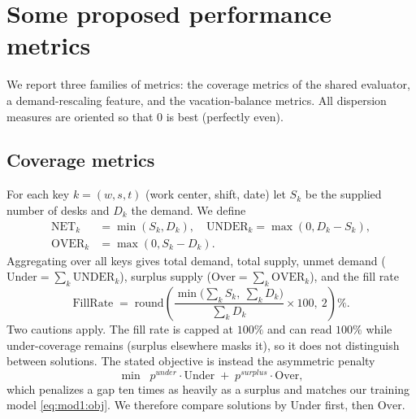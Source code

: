 \documentclass[preprint,12pt]{elsarticle}
\begin{document}
\section{Some proposed performance metrics} \label{sec:metrics}
   We report three families of metrics: the coverage metrics of the shared evaluator, a demand-rescaling feature, and the vacation-balance metrics. All dispersion measures are oriented so that $0$ is best (perfectly even).

   \subsection{Coverage metrics}
   For each key $k=(w,s,t)$ (work center, shift, date) let $S_k$ be the supplied number of desks and $D_k$ the demand. We define
   \begin{equation}
      \begin{aligned}
         \mathrm{NET}_k &= \min(S_k, D_k), \quad
         \mathrm{UNDER}_k = \max(0, D_k - S_k),\\
         \mathrm{OVER}_k &= \max(0, S_k - D_k).
      \end{aligned}
   \end{equation}
   Aggregating over all keys gives total demand, total supply, unmet demand ($\mathrm{Under}=\sum\limits_k \mathrm{UNDER}_k$), surplus supply ($\mathrm{Over}=\sum\limits_k \mathrm{OVER}_k$), and the fill rate
   \begin{equation}
      \mathrm{FillRate} \;=\; \mathrm{round}\!\left(
      \frac{\min\!\big(\sum\limits_k S_k,\ \sum\limits_k D_k\big)}{\sum\limits_k D_k}\times 100,\ 2
      \right)\% .
   \end{equation}
   Two cautions apply. The fill rate is capped at $100\%$ and can read $100\%$ while under-coverage remains (surplus elsewhere masks it), so it does not distinguish between solutions. The stated objective is instead the asymmetric penalty
   \begin{equation}
      \min \;\; p^{under} \cdot \mathrm{Under} \;+\; p^{surplus} \cdot \mathrm{Over},
   \end{equation}
   which penalizes a gap ten times as heavily as a surplus and matches our training model \eqref{eq:mod1:obj}. We therefore compare solutions by $\mathrm{Under}$ first, then $\mathrm{Over}$.
\end{document}

